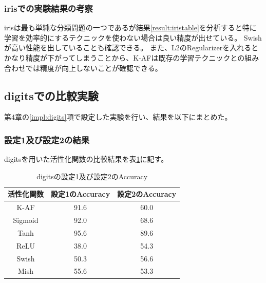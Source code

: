 \subsubsection{irisでの実験結果の考察}


irisは最も単純な分類問題の一つであるが結果\ref{result:iristable}を分析すると特に学習を効率的にするテクニックを使わない場合は良い精度が出せている。
Swishが高い性能を出していることも確認できる。
また、L2のRegularizerを入れるとかなり精度が下がってしまうことから、K-AFは既存の学習テクニックとの組み合わせでは精度が向上しないことが確認できる。






\subsection{digitsでの比較実験}
\label{ev:digitsでの比較実験}
第4章の\ref{impl:digits}項で設定した実験を行い、結果を以下にまとめた。
\subsubsection{設定1及び設定2の結果}
\label{digits:result}

digitsを用いた活性化関数の比較結果を表\ref{result:digitstable}に記す。

\begin{table}[htbp]
    \begin{center}
        \caption{digitsの設定1及び設定2のAccuracy}
        \label{result:digitstable}
        \vspace{2mm} 
        \begin{tabular}{|c|c|c|}
            \hline
            活性化関数              & 設定1のAccuracy &  設定2のAccuracy \\
            \hline
            K-AF            & 91.6 & 60.0 \\
            \hline
            Sigmoid            & 92.0 & 68.6\\
            \hline
            Tanh            & 95.6 & 89.6 \\
            \hline
            ReLU        & 38.0 & 54.3 \\
            \hline
            Swish           & 50.3 & 56.6 \\
            \hline
            Mish           & 55.6 & 53.3 \\
            \hline
    
        \end{tabular}
    \end{center}
\end{table}


